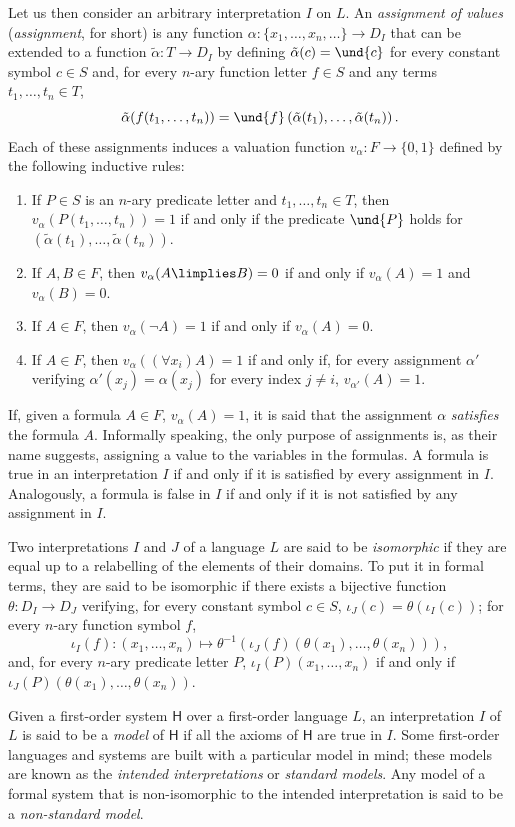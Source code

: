 \begin{definition}
Let us then consider an arbitrary interpretation $I$ on $L$. An \emph{assignment of values} (\emph{assignment}, for short)  is any function $\alpha : \{x_1,\ldots, x_n,\ldots\} \longrightarrow D_I$ that can be extended to a function $\tilde{\alpha}:T\longrightarrow D_I$ by defining $\tilde{\alpha}(c) = \und{c}$ for every constant symbol $c\in S$ and, for every $n$-ary function letter $f\in S$ and any terms $t_1,\ldots,t_n\in T$,
\[\tilde{\alpha}(f(t_1,\ldots,t_n)) = \und{f}\left( \tilde{\alpha}(t_1),\ldots,\tilde{\alpha}(t_n) \right). \]
Each of these assignments induces a valuation function $v_\alpha:F\longrightarrow\{0,1\}$ defined by the following inductive rules:
\begin{enumerate}
\item If $P\in S$ is an $n$-ary predicate letter and $t_1,\ldots,t_n \in T$, then $v_\alpha(P(t_1,\ldots,t_n)) = 1$ if and only if the predicate $\und{P}$ holds for $(\tilde{\alpha}(t_1),\ldots,\tilde{\alpha}(t_n))$.
\item If $A,B\in F$, then $v_\alpha(A\limplies B) = 0$ if and only if $v_\alpha(A) = 1$ and $v_\alpha(B) = 0$.
\item If $A \in F$, then $v_\alpha(\lnot A) = 1$ if and only if $v_\alpha(A) = 0$.
\item If $A\in F$, then $v_\alpha((\forall x_i) A) = 1$ if and only if, for every assignment $\alpha'$ verifying $\alpha'(x_j) = \alpha(x_j)$ for every index $j\neq i$, $v_{\alpha'}(A) = 1$.
\end{enumerate}
If, given a formula $A\in F$, $v_\alpha(A) = 1$, it is said that the assignment $\alpha$ \emph{satisfies} the formula $A$.
Informally speaking, the only purpose of assignments is, as their name suggests, assigning a value to the variables in the formulas.
A formula is true in an interpretation $I$ if and only if it is satisfied by every assignment in $I$.
Analogously, a formula is false in $I$ if and only if it is not satisfied by any assignment in $I$. 

Two interpretations $I$ and $J$ of a language $L$ are said to be \emph{isomorphic} if they are equal up to a relabelling of the elements of their domains.
To put it in formal terms, they are said to be isomorphic if there exists a bijective function $\theta: D_I \longrightarrow D_J$ verifying, for every constant symbol $c\in S$, $\iota_J(c) = \theta(\iota_I(c))$; for every $n$-ary function symbol $f$,
\[\iota_I(f):(x_1,\ldots,x_n)\longmapsto \theta^{-1}(\iota_J(f)(\theta(x_1),\ldots,\theta(x_n))),\]
and, for every $n$-ary predicate letter $P$, $\iota_I(P)(x_1,\ldots,x_n)$ if and only if $\iota_J(P)(\theta(x_1),\ldots,\theta(x_n))$. 

Given a first-order system $\mathsf{H}$ over a first-order language $L$, an interpretation $I$ of $L$ is said to be a \emph{model} of $\mathsf{H}$ if all the axioms of $\mathsf{H}$ are true in $I$.
Some first-order languages and systems are built with a particular model in mind; these models are known as the \emph{intended interpretations} or \emph{standard models}.
Any model of a formal system that is non-isomorphic to the intended interpretation is said to be a \emph{non-standard model}.
\label{<+label+>}
\end{definition}

